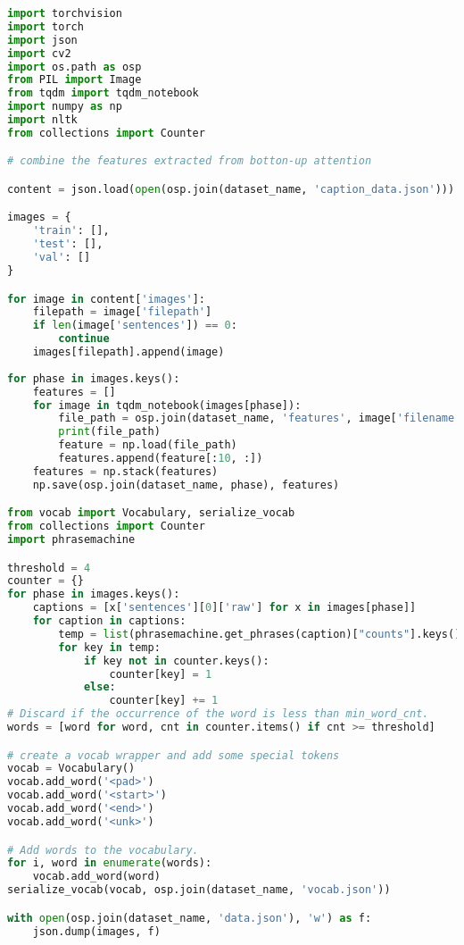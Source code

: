 \begin{lstlisting}[language=Python]
import torchvision
import torch
import json
import cv2
import os.path as osp
from PIL import Image
from tqdm import tqdm_notebook
import numpy as np
import nltk
from collections import Counter

# combine the features extracted from botton-up attention

content = json.load(open(osp.join(dataset_name, 'caption_data.json')))

images = {
    'train': [],
    'test': [],
    'val': []
}

for image in content['images']:
    filepath = image['filepath']
    if len(image['sentences']) == 0:
        continue
    images[filepath].append(image)
    
for phase in images.keys():
    features = []
    for image in tqdm_notebook(images[phase]):
        file_path = osp.join(dataset_name, 'features', image['filename'].split('.')[0] + '.npy')
        print(file_path)
        feature = np.load(file_path)
        features.append(feature[:10, :])
    features = np.stack(features)
    np.save(osp.join(dataset_name, phase), features)

from vocab import Vocabulary, serialize_vocab
from collections import Counter
import phrasemachine

threshold = 4
counter = {}
for phase in images.keys():
    captions = [x['sentences'][0]['raw'] for x in images[phase]]
    for caption in captions:
        temp = list(phrasemachine.get_phrases(caption)["counts"].keys())
        for key in temp:
            if key not in counter.keys():
                counter[key] = 1
            else:
                counter[key] += 1
# Discard if the occurrence of the word is less than min_word_cnt.
words = [word for word, cnt in counter.items() if cnt >= threshold]

# create a vocab wrapper and add some special tokens
vocab = Vocabulary()
vocab.add_word('<pad>')
vocab.add_word('<start>')
vocab.add_word('<end>')
vocab.add_word('<unk>')

# Add words to the vocabulary.
for i, word in enumerate(words):
    vocab.add_word(word)
serialize_vocab(vocab, osp.join(dataset_name, 'vocab.json'))

with open(osp.join(dataset_name, 'data.json'), 'w') as f:
    json.dump(images, f)
\end{lstlisting}
